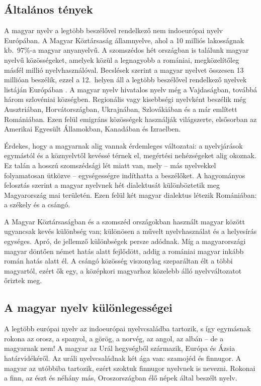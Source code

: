 \begin{multicols}{2}

\subsection{Általános tények}

A magyar nyelv a legtöbb beszélővel rendelkező nem indoeurópai nyelv Európában. A Magyar Köztársaság államnyelve, ahol a 10 milliós lakosságnak kb.\ 97\%-a magyar anyanyelvű. A szomszédos hét országban is találunk ma\-gyar nyelvű közösségeket, amelyek közül a legnagyobb a romániai, megközelítőleg másfél millió nyelvhasználóval. Becs\-lé\-sek szerint a magyar nyelvet összesen 13 millióan beszélik, ezzel a 12.~helyen áll a legtöbb beszélővel rendelkező nyelvek listáján Európában \cite{didyouknow1}. A ma\-gyar nyelv hivatalos nyelv még a Vajdaságban, továbbá három szlovéniai községben. Regionális vagy kisebbségi nyelvként beszélik még Ausztriában, Horvátországban, Ukrajnában, Szlovákiában és a már említett Romániában. Ezen felül emig\-ráns közösségek használják világszerte, elsősorban az Amerikai Egyesült Államokban, Kanadában és Izraelben.   

Érdekes, hogy a magyarnak alig vannak érdemleges változatai: a nyelvjárások egymástól és a köznyelvtől kevéssé térnek el, megértési nehézségeket alig okoznak. Ez talán a hosszú szomszédsági lét miatt van, mely -- más nyelvekkel fo\-lya\-ma\-to\-san ütközve -- egységességre indíthatta a beszélőket. A hagyományos felosztás szerint a magyar nyelvnek hét dialektusát különböztetik meg Magyarország mai területén. Ezen felül két magyar dialektus létezik Romániában: a székely és a csángó.   

A Magyar Köztársaságban és a szomszéd országokban használt magyar között ugyancsak kevés különbség van; különösen a művelt nyelvhasználat és a helyesírás egységes. Apró, de jellemző különbségek persze adódnak. Míg a magyarországi magyar döntően német hatás alatt fej\-lő\-dött, addig a romániai magyar inkább román hatás alatt él. A csángó közösség viszonylag szeparáltan élt a többi ma\-gyar\-tól, ezért ők egy, a középkori magyarhoz közelebb álló nyelvváltozatot őriztek meg. 

\subsection{A magyar nyelv különlegességei}

A legtöbb európai nyelv az indoeurópai nyelvcsaládba tartozik, s így egymásnak rokona az orosz, a spanyol, a görög, a norvég, az angol, az albán -- de a magyarnak nem! A magyar az Urál hegységből származik, Európa és Ázsia határvidékéről. Az uráli nyelvcsaládnak két ága van: szamojéd és finnugor. A magyar az utóbbiba tartozik, ezért szoktuk finnugor nyelvnek is nevezni. Rokonai a finn, az észt és néhány más, Oroszországban élő népek által beszélt nyelv.


\end{multicols}
